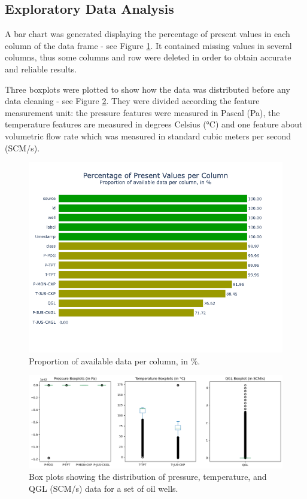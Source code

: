 \documentclass{article}
\begin{document}
\subsection{Exploratory Data Analysis}

A bar chart was generated displaying the percentage of present values in each column of the data frame - see Figure \ref{fig:missingvalues}. It contained missing values in several columns, thus some columns and row were deleted in order to obtain accurate and reliable results.

Three boxplots were plotted to show how the data was distributed before any data cleaning - see Figure \ref{fig:distr_boxplots_before_cleaning}. They were divided according the feature measurement unit: the pressure features were measured in Pascal (Pa), the temperature features are measured in degrees Celsius (°C) and one feature about volumetric flow rate which was measured in standard cubic meters per second (SCM/s).

\begin{figure}
\centering
\includegraphics[width=1\textwidth]{missingvalues.png}
\caption{\label{fig:missingvalues}Proportion of available data per column, in \%.}
\end{figure}


\begin{figure}
\centering
\includegraphics[width=1\textwidth]{distr_boxplots_before_cleaning.png}
\caption{\label{fig:distr_boxplots_before_cleaning}Box plots showing the distribution of pressure, temperature, and QGL (SCM/s) data for a set of oil wells.}
\end{figure}
\end{document}
